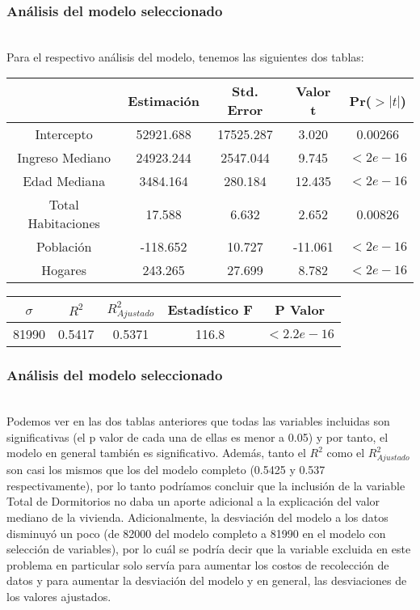 \documentclass[12pt]{beamer}
\begin{document}
\begin{frame}
\frametitle{Análisis del modelo seleccionado}
~\\Para el respectivo análisis del modelo, tenemos las siguientes dos tablas:
\begin{center}
\begin{tabular}{|ccccc|}
\hline 
 & Estimación & Std. Error & Valor t & Pr($>|t|$) \\ 
\hline 
Intercepto & 52921.688 & 17525.287 & 3.020 & 0.00266 \\ 
Ingreso Mediano & 24923.244 & 2547.044 & 9.745 & $<2e-16$ \\  
Edad Mediana & 3484.164 & 280.184 & 12.435 & $<2e-16$ \\ 
Total Habitaciones & 17.588 & 6.632 & 2.652 & 0.00826 \\ 
Población & -118.652 & 10.727 & -11.061 & $<2e-16$ \\  
Hogares & 243.265 & 27.699 & 8.782 & $<2e-16$ \\ 
\hline 
\end{tabular} 
\end{center}
\begin{center}
\begin{tabular}{|c|c|c|c|c|}
\hline 
$\hat{\sigma}$ & $R^2$ & $R^2_{Ajustado}$ & Estadístico F & P Valor \\ 
\hline 
81990 & 0.5417 & 0.5371 & 116.8 & $<2.2e-16$ \\ 
\hline 
\end{tabular} 
\end{center}
\end{frame}

\begin{frame}
\frametitle{Análisis del modelo seleccionado}
~\\Podemos ver en las dos tablas anteriores que todas las variables incluidas son significativas (el p valor de cada una de ellas es menor a 0.05) y por tanto, el modelo en general también es significativo. Además, tanto el $R^2$ como el $R^2_{Ajustado}$ son casi los mismos que los del modelo completo (0.5425 y 0.537 respectivamente), por lo tanto podríamos concluir que la inclusión de la variable Total de Dormitorios no daba un aporte adicional a la explicación del valor mediano de la vivienda. Adicionalmente, la desviación del modelo a los datos disminuyó un poco (de 82000 del modelo completo a 81990 en el modelo con selección de variables), por lo cuál se podría decir que la variable excluida en este problema en particular solo servía para aumentar los costos de recolección de datos y para aumentar la desviación del modelo y en general, las desviaciones de los valores ajustados.
\end{frame}
\end{document}
